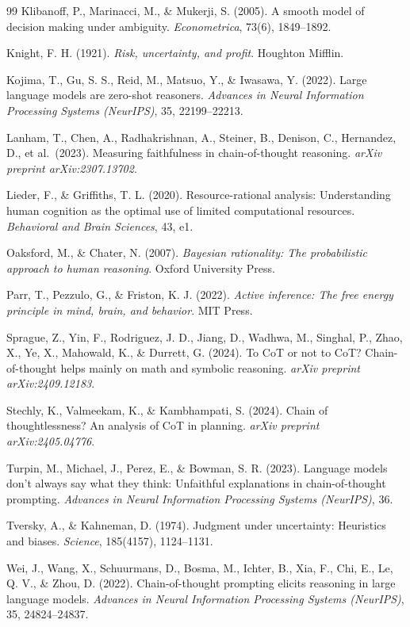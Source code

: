 \documentclass{article}
\begin{document}
\begin{thebibliography}{99}
 Klibanoff, P., Marinacci, M., \& Mukerji, S. (2005). A smooth model of decision making under ambiguity. \emph{Econometrica}, 73(6), 1849--1892.

 Knight, F. H. (1921). \emph{Risk, uncertainty, and profit}. Houghton Mifflin.

 Kojima, T., Gu, S. S., Reid, M., Matsuo, Y., \& Iwasawa, Y. (2022). Large language models are zero-shot reasoners. \emph{Advances in Neural Information Processing Systems (NeurIPS)}, 35, 22199--22213.

 Lanham, T., Chen, A., Radhakrishnan, A., Steiner, B., Denison, C., Hernandez, D., et al.~(2023). Measuring faithfulness in chain-of-thought reasoning. \emph{arXiv preprint arXiv:2307.13702}.

 Lieder, F., \& Griffiths, T. L. (2020). Resource-rational analysis: Understanding human cognition as the optimal use of limited computational resources. \emph{Behavioral and Brain Sciences}, 43, e1.

 Oaksford, M., \& Chater, N. (2007). \emph{Bayesian rationality: The probabilistic approach to human reasoning}. Oxford University Press.

 Parr, T., Pezzulo, G., \& Friston, K. J. (2022). \emph{Active inference: The free energy principle in mind, brain, and behavior}. MIT Press.

 Sprague, Z., Yin, F., Rodriguez, J. D., Jiang, D., Wadhwa, M., Singhal, P., Zhao, X., Ye, X., Mahowald, K., \& Durrett, G. (2024). To CoT or not to CoT? Chain-of-thought helps mainly on math and symbolic reasoning. \emph{arXiv preprint arXiv:2409.12183}.

 Stechly, K., Valmeekam, K., \& Kambhampati, S. (2024). Chain of thoughtlessness? An analysis of CoT in planning. \emph{arXiv preprint arXiv:2405.04776}.

 Turpin, M., Michael, J., Perez, E., \& Bowman, S. R. (2023). Language models don't always say what they think: Unfaithful explanations in chain-of-thought prompting. \emph{Advances in Neural Information Processing Systems (NeurIPS)}, 36.

 Tversky, A., \& Kahneman, D. (1974). Judgment under uncertainty: Heuristics and biases. \emph{Science}, 185(4157), 1124--1131.

 Wei, J., Wang, X., Schuurmans, D., Bosma, M., Ichter, B., Xia, F., Chi, E., Le, Q. V., \& Zhou, D. (2022). Chain-of-thought prompting elicits reasoning in large language models. \emph{Advances in Neural Information Processing Systems (NeurIPS)}, 35, 24824--24837.

\end{thebibliography}
\end{document}
